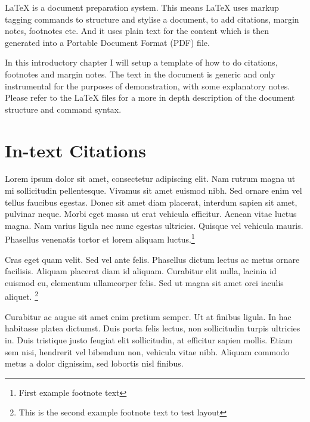 
LaTeX is a document preparation system. This means LaTeX uses markup tagging commands to structure and stylise a document, to add citations, margin notes, footnotes etc. And it uses plain text for the content which is then generated into a Portable Document Format (PDF) file. 

In this introductory chapter I will setup a template of how to do citations, footnotes and margin notes. The text in the document is generic and only instrumental for the purposes of demonstration, with some explanatory notes. Please refer to the LaTeX files for a more in depth description of the document structure and command syntax. 



\newpage

\section{In-text Citations}

Lorem ipsum  \parencite{sennett1998corrosion} dolor sit amet, consectetur adipiscing elit. Nam rutrum magna ut mi sollicitudin pellentesque. Vivamus sit amet euismod nibh. Sed ornare enim vel tellus faucibus egestas. Donec sit amet diam placerat, interdum sapien sit amet, pulvinar neque. Morbi eget massa ut erat vehicula efficitur. Aenean vitae luctus magna. Nam varius ligula nec nunc egestas ultricies. Quisque vel vehicula mauris. Phasellus venenatis tortor et lorem aliquam luctus.\footnote{First example footnote text}

Cras eget quam velit. Sed vel ante felis. Phasellus dictum lectus ac metus ornare facilisis. Aliquam placerat diam id  aliquam. Curabitur elit nulla, lacinia id euismod eu, elementum ullamcorper felis. Sed ut magna sit amet orci iaculis aliquet.  \footnote{This is the second example footnote text to test layout}

Curabitur ac augue sit amet enim pretium semper.   Ut at finibus ligula. In hac habitasse platea dictumst. Duis porta felis lectus, non sollicitudin turpis ultricies in. Duis tristique justo feugiat elit sollicitudin, at efficitur sapien mollis. Etiam sem nisi, hendrerit vel bibendum non, vehicula vitae nibh. Aliquam commodo metus a dolor dignissim, sed lobortis nisl finibus. 

